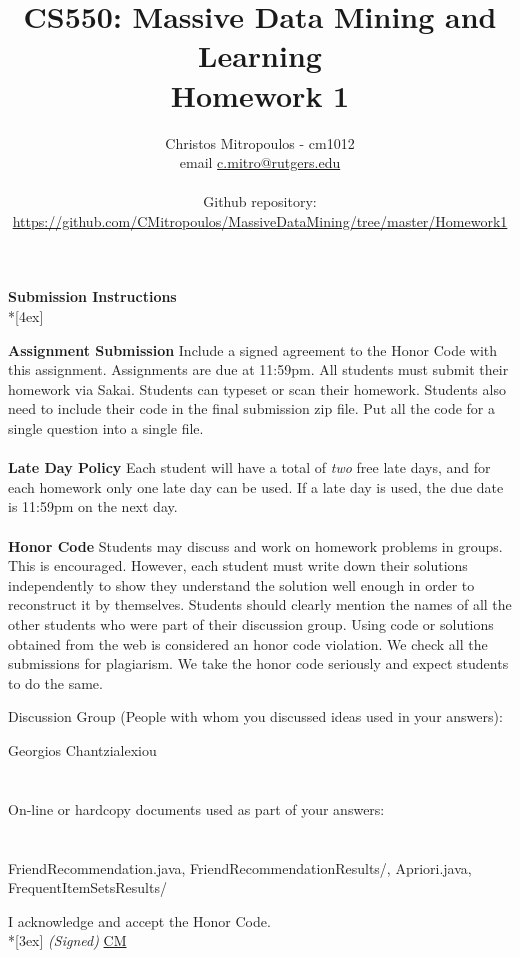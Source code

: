 \documentclass[11pt]{article}
\title{\LARGE{\bf \textsf{CS550: Massive Data Mining and Learning}}\\ {\bf \textsf{Homework 1}}}
\author{Christos Mitropoulos - cm1012 \\ email \href{mailto:c.mitro@rutgers.edu}{c.mitro@rutgers.edu} \\\\ Github repository:\\ \href{https://github.com/CMitropoulos/MassiveDataMining/tree/master/Homework1}{https://github.com/CMitropoulos/MassiveDataMining/tree/master/Homework1}}
\date{}
\begin{document}
\begin{titlepage}
\maketitle
\end{titlepage}

\pagebreak[4]
\begin{center}
\LARGE{\bf \textsf{Submission Instructions}} \\*[4ex]
\end{center}

\textbf{Assignment Submission } Include a signed agreement to the Honor Code with this assignment. Assignments are due at 11:59pm. All students must submit their homework via Sakai. Students can typeset or scan their homework. Students also need to include their code in the final submission zip file. Put all the code for a single question into a single file. 
\\
\\
\textbf{Late Day Policy } Each student will have a total of {\em two} free late days, and for each homework only one late day can be used. If a late day is used, the due date is 11:59pm on the next day.
\\
\\
\textbf{Honor Code } Students may discuss and work on homework problems in groups. This is encouraged. However, each student must write down their solutions independently to show they understand the solution well enough in order to reconstruct it by themselves.  Students should clearly mention the names of all the other students who were part of their discussion group. Using code or solutions obtained from the web is considered an honor code violation. We check all the submissions for plagiarism. We take the honor code seriously and expect students to do the same. 

\vfill
\vfill

Discussion Group (People with whom you discussed ideas used in your answers):

 Georgios Chantzialexiou \\\\\\
On-line or hardcopy documents used as part of your answers: \\\\\\
\vfill
FriendRecommendation.java, FriendRecommendationResults/, Apriori.java, FrequentItemSetsResults/
\vfill

I acknowledge and accept the Honor Code.\\*[3ex]
\bigskip
\textit{(Signed)} \underline{CM} 
\end{document}
